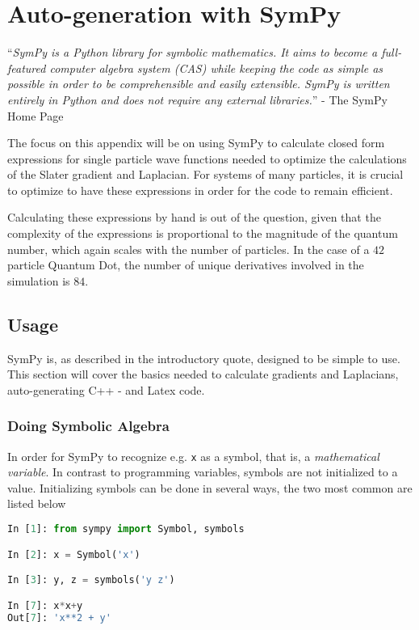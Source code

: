 
\chapter{Auto-generation with SymPy}

``\textit{SymPy is a Python library for symbolic mathematics. It aims to become a full-featured computer algebra system (CAS) while keeping the code as simple as possible in order to be comprehensible and easily extensible. SymPy is written entirely in Python and does not require any external libraries.}'' - The SymPy Home Page

The focus on this appendix will be on using SymPy to calculate closed form expressions for single particle wave functions needed to optimize the calculations of the Slater gradient and Laplacian. For systems of many particles, it is crucial to optimize to have these expressions in order for the code to remain efficient. 

Calculating these expressions by hand is out of the question, given that the complexity of the expressions is proportional to the magnitude of the quantum number, which again scales with the number of particles. In the case of a $42$ particle Quantum Dot, the number of unique derivatives involved in the simulation is $84$. 

\section{Usage}

SymPy is, as described in the introductory quote, designed to be simple to use. This section will cover the basics needed to calculate gradients and Laplacians, auto-generating C++ - and Latex code.

\subsection{Doing Symbolic Algebra}

In order for SymPy to recognize e.g. \verb+x+ as a symbol, that is, a \textit{mathematical variable}. In contrast to programming variables, symbols are not initialized to a value. Initializing symbols can be done in several ways, the two most common are listed below

\begin{lstlisting}[language=Python]
In [1]: from sympy import Symbol, symbols

In [2]: x = Symbol('x')

In [3]: y, z = symbols('y z')

In [7]: x*x+y
Out[7]: 'x**2 + y'

\end{lstlisting}

